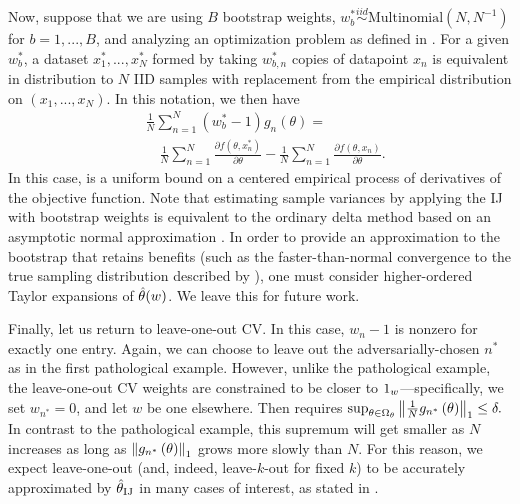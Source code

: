 Now, suppose that we are using $B$ bootstrap weights,
$w_{b}^{*}\stackrel{iid}{\sim} \mathrm{Multinomial}\left(N,N^{-1}\right)$ for
$b=1,...,B$, and analyzing an optimization problem as defined in
.
For a given $w_{b}^{*}$, a dataset $x_{1}^*,...,x_{N}^*$ formed by taking
$w_{b,n}^{*}$ copies of datapoint $x_n$ is equivalent in distribution to
$N$ IID samples with replacement from the empirical distribution
on $\left(x_{1},...,x_{N}\right)$.  In this notation, we then have
%
\begin{align*}
&\frac{1}{N}\sum_{n=1}^{N}\left(w_{b}^{*}-1\right)g_{n}\left(\theta\right) = \\
&\quad \frac{1}{N}\sum_{n=1}^{N}\frac{\partial
    f\left(\theta,x_{n}^{*}\right)}{\partial\theta} -
        \frac{1}{N}\sum_{n=1}^{N}\frac{\partial
    f\left(\theta,x_{n}\right)}{\partial\theta}.
\end{align*}
%
In this case,  is a uniform bound on a centered
empirical process of derivatives of the objective function. Note that estimating
sample variances by applying the IJ with bootstrap weights is equivalent to the
ordinary delta method based on an asymptotic normal approximation \citep[Chapter
21]{efron:1982:jackknife}.  In order to provide an approximation to the
bootstrap that retains benefits (such as the faster-than-normal convergence to
the true sampling distribution described by \citet{hall:2013:bootstrap}), one
must consider higher-ordered Taylor expansions of $\hat{\theta}(w)$.  We leave this for
future work.

Finally, let us return to leave-one-out CV. In this case, $w_{n}-1$ is nonzero
for exactly one entry. Again, we can choose to leave out the
adversarially-chosen $n^{*}$ as in the first pathological example.  However,
unlike the pathological example, the leave-one-out CV weights are constrained to
be closer to $1_{w}$---specifically, we set $w_{n^{*}}=0$, and let $w$ be one
elsewhere. Then  requires
%
$\sup_{\theta\in\Omega_{\theta}}\left\Vert \frac{1}{N}g_{n^{*}}\left(\theta\right)\right\Vert_{1}  \le\delta.$
%
In contrast to the pathological example, this supremum will get smaller as $N$
increases as long as $\left\Vert g_{n^{*}}\left(\theta\right)\right\Vert_{1}$ grows more slowly
than $N$. For this reason, we expect leave-one-out (and, indeed, leave-$k$-out
for fixed $k$) to be accurately approximated by $\hat{\theta}_{\textrm{IJ}}$ in many cases of
interest, as stated in .
%
